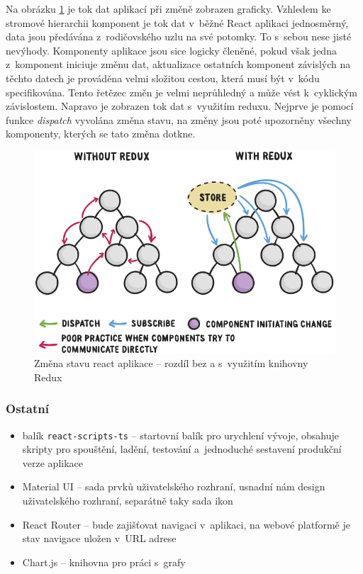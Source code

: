 Na obrázku \ref{reared} je tok dat aplikací při změně zobrazen graficky. Vzhledem ke stromové hierarchii komponent je tok dat v~běžné React aplikaci jednosměrný, data jsou předávána z~rodičovského uzlu na své potomky. To s~sebou nese jisté nevýhody. Komponenty aplikace jsou sice logicky členěné, pokud však jedna z~komponent iniciuje změnu dat, aktualizace ostatních komponent závislých na těchto datech je prováděna velmi složitou cestou, která musí být v~kódu specifikována. Tento řetězec změn je velmi neprůhledný a může vést k~cyklickým závislostem. Napravo je zobrazen tok dat s~využitím reduxu. Nejprve je pomocí funkce \textit{dispatch} vyvolána změna stavu, na změny jsou poté upozorněny všechny komponenty, kterých se tato změna dotkne.


\begin{figure}
  \centering
  \includegraphics[width=14cm]{img/reactredux.png}
  \caption{Změna stavu react aplikace -- rozdíl bez a s~využitím knihovny Redux \cite{redux}}
  \label{reared}
\end{figure}


\subsubsection{Ostatní}
\begin{itemize}
	\item balík \texttt{react-scripts-ts} -- startovní balík pro urychlení vývoje, obsahuje skripty pro spouštění, ladění, testování a~jednoduché sestavení produkční verze aplikace
	\item Material UI -- sada prvků uživatelského rozhraní, usnadní nám design uživatelského rozhraní, separátně taky sada ikon
  \item React Router -- bude zajišťovat navigaci v~aplikaci, na webové platformě je stav navigace uložen v~URL adrese
	\item Chart.js -- knihovna pro práci s~grafy
\end{itemize} 






